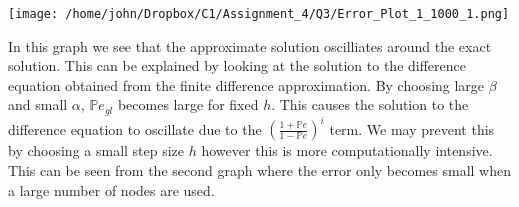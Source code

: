 \documentclass[letterpaper,12pt]{article}
\newcommand{\Prob}{\mathbb{P}}
\begin{document}
\centerline{\texttt{[image: /home/john/Dropbox/C1/Assignment\_4/Q3/Error\_Plot\_1\_1000\_1.png]}}

In this graph we see that the approximate solution oscilliates around the exact solution. This can be explained by looking at the solution to the difference equation obtained from the finite difference approximation. By choosing large $\beta$ and small $\alpha$, $\Prob e_{gl}$ becomes large for fixed $h$. This causes the solution to the difference equation to oscillate due to the $(\frac{1 + \Prob e}{1 - \Prob e})^i$ term. We may prevent this by choosing a small step size $h$ however this is more computationally intensive. This can be seen from the second graph where the error only becomes small when a large number of nodes are used.
\end{document}
